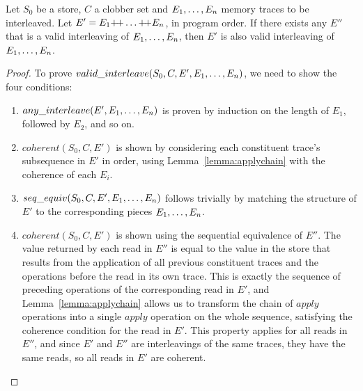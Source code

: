 \begin{thm}
\label{thm:sequential}
\rm
Let $S_0$ be a store, $C$ a clobber set and ${E}_1,\ldots,{E}_n$ memory traces to be
interleaved.  Let $E' = E_1 \text{+\!+} \ldots \text{+\!+} E_n$, in program order.  If there exists any $E''$ that is a
valid interleaving of ${E}_1,\ldots,{E}_n$, then $E'$ is also valid interleaving of ${E}_1,\ldots,{E}_n$.
\end{thm}

\begin{proof}
To prove $valid\_interleave(S_0, C, E', {E}_1,\ldots,{E}_n)$, we need to show the four conditions:
\begin{enumerate}
\item $any\_interleave(E', {E}_1,\ldots,{E}_n)$ is proven by induction on
the length of $E_1$, followed by $E_2$, and so on.
\item $coherent(S_0, C, E')$ is shown by considering each constituent trace's subsequence in $E'$
in order, using Lemma~\ref{lemma:applychain} with the coherence of each $E_i$.
\item $seq\_equiv(S_0, C, E', {E}_1,\ldots,{E}_n)$ follows trivially by matching the structure of $E'$
to the corresponding  pieces ${E}_1,\ldots,{E}_n$.
\item $coherent(S_0, C, E')$ is shown using the sequential equivalence of $E''$.  The value 
returned by each read in $E''$ is equal to the value in the store that results
from the application of all previous constituent traces and the operations before the read in its
own trace.  This is exactly the sequence of preceding operations of the corresponding read in $E'$,
and Lemma~\ref{lemma:applychain} allows us to transform the chain of $apply$ operations into a 
single $apply$ operation on the whole sequence, satisfying the coherence condition for the read
in $E'$.  This property applies for all reads in $E''$, and since $E'$ and $E''$ are
interleavings of the same traces, they have the same reads, so all reads
in $E'$ are coherent.
\end{enumerate}
\end{proof}

